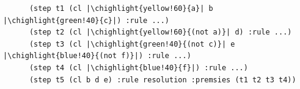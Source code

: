 \documentclass[usepdftitle=false,aspectratio=169]{beamer}
\newcommand\chighlight[2]{\setlength{\fboxsep}{0pt}\colorbox{#1}{#2\strut}}
\begin{document}
\begin{frame}[fragile]
\begin{overprint}
    \begin{prooftree}
    \end{prooftree}
    \begin{verbatim}
      (step t1 (cl |\chighlight{yellow!60}{a}| b |\chighlight{green!40}{c}|) :rule ...)
      (step t2 (cl |\chighlight{yellow!60}{(not a)}| d) :rule ...)
      (step t3 (cl |\chighlight{green!40}{(not c)}| e |\chighlight{blue!40}{(not f)}|) :rule ...)
      (step t4 (cl |\chighlight{blue!40}{f}|) :rule ...)
      (step t5 (cl b d e) :rule resolution :premsies (t1 t2 t3 t4))
    \end{verbatim}
    \begin{prooftree}
    \end{prooftree}
  \end{overprint}
\end{frame}
\end{document}
